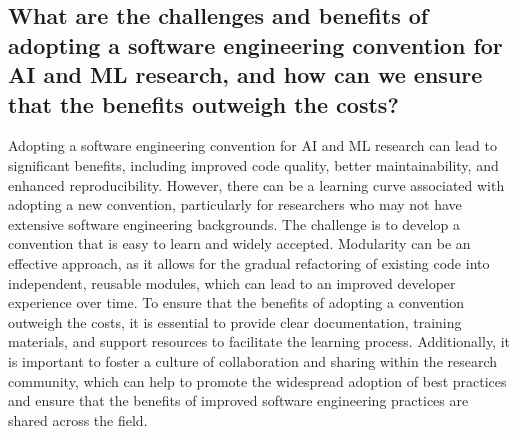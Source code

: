     \subsection{
    What are the challenges and benefits of adopting a software engineering convention for AI and ML research, and how can we ensure that the benefits outweigh the costs?
    }
    Adopting a software engineering convention for AI and ML research can lead to significant benefits, including improved code quality, better maintainability, and enhanced reproducibility. However, there can be a learning curve associated with adopting a new convention, particularly for researchers who may not have extensive software engineering backgrounds. The challenge is to develop a convention that is easy to learn and widely accepted. Modularity can be an effective approach, as it allows for the gradual refactoring of existing code into independent, reusable modules, which can lead to an improved developer experience over time. To ensure that the benefits of adopting a convention outweigh the costs, it is essential to provide clear documentation, training materials, and support resources to facilitate the learning process. Additionally, it is important to foster a culture of collaboration and sharing within the research community, which can help to promote the widespread adoption of best practices and ensure that the benefits of improved software engineering practices are shared across the field.



